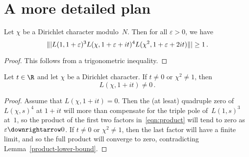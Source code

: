 \section{A more detailed plan}

\begin{lemma} \label{product-lower-bound}
  \leanok
  Let $\chi$ be a Dirichlet character modulo~$N$. Then for all $\varepsilon > 0$, we have
  \begin{equation} \label {eqn:product}
    \||L(1, 1 + \varepsilon)^3 L(\chi, 1 + \varepsilon + it)^4 L(\chi^2, 1 + \varepsilon + 2it)\|| \ge 1 \,.
  \end{equation}
\end{lemma}

\begin{proof}
  \leanok
  This follows from a trigonometric inequality.
\end{proof}

\begin{lemma} \label{non-quadratic}
  Let $t \in \R$ and let $\chi$ be a Dirichlet character. If $t \ne 0$ or $\chi^2 \ne 1$, then
  \[ L(\chi, 1 + it) \ne 0 \,. \]
\end{lemma}

\begin{proof}
  Assume that $L(\chi, 1 + it) = 0$. Then the (at lesat) quadruple zero of~$L(\chi, s)^4$ at $1 + it$
  will more than compensate for the triple pole of~$L(1, s)^3$ at~$1$, so the product of the first
  two factors in~\eqref{eqn:product} will tend to zero as $\eps \downrightarrow 0$.
  If $t \ne 0$ or $\chi^2 \ne 1$, then the last factor will have a finite limit, and so the
  full product will converge to zero, contradicting Lemma~\ref{product-lower-bound}.
\end{proof}
